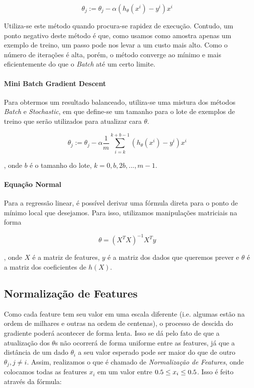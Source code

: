 \documentclass[conference]{IEEEtran}
\begin{document}
\begin{equation} \label{eq:stochastic_descent}
\theta_{j} := \theta_{j} - \alpha(h_{\theta}(x^{i}) - y^{i}) x^{i}
\end{equation}

Utiliza-se este método quando procura-se rapidez de execução. Contudo, um ponto negativo deste método é que, como usamos como amostra apenas um exemplo de treino, um passo pode nos levar a um custo mais alto. Como o número de iterações é alta, porém, o método converge ao mínimo e mais eficientemente do que o \textit{Batch} até um certo limite.

\paragraph{Mini Batch Gradient Descent}

Para obtermos um resultado balanceado, utiliza-se uma mistura dos métodos \textit{Batch} e \textit{Stochastic}, em que define-se um tamanho para o lote de exemplos de treino que serão utilizados para atualizar cara $\theta$.

\begin{equation} \label{eq:minibatch_descent}
\theta_{j} := \theta_{j} - \alpha \dfrac{1}{m} \sum_{i=k}^{k+b-1}(h_{\theta}(x^{i}) - y^{i}) x^{i}
\end{equation}

, onde $b$ é o tamanho do lote, $k = 0, b, 2b, ..., m-1$.

\paragraph{Equação Normal}

Para a regressão linear, é possível derivar uma fórmula direta para o ponto de mínimo local que desejamos. Para isso, utilizamos manipulações matriciais na forma

\begin{equation} \label{eq:normal}
\theta = (X^{T}X)^{-1}X^{T}y
\end{equation}

, onde $X$ é a matriz de features, $y$ é a matriz dos dados que queremos prever e $\theta$ é a matriz dos coeficientes de $h(X)$.

\subsection{Normalização de Features}

Como cada feature tem seu valor em uma escala diferente (i.e. algumas estão na ordem de milhares e outras na ordem de centenas), o processo de descida do gradiente poderá acontecer de forma lenta. Isso se dá pelo fato de que a atualização dos $\theta$s não ocorrerá de forma uniforme entre as features, já que a distância de um dado $\theta_{i}$ a seu valor esperado pode ser maior do que de outro $\theta_{j}, j \neq i$. Assim, realizamos o que é chamado de \textit{Normalização de Features}, onde colocamos todas as features $x_{i}$ em um valor entre $ \-0.5 \leq x_{i} \leq 0.5$. Isso é feito através da fórmula:
\end{document}
